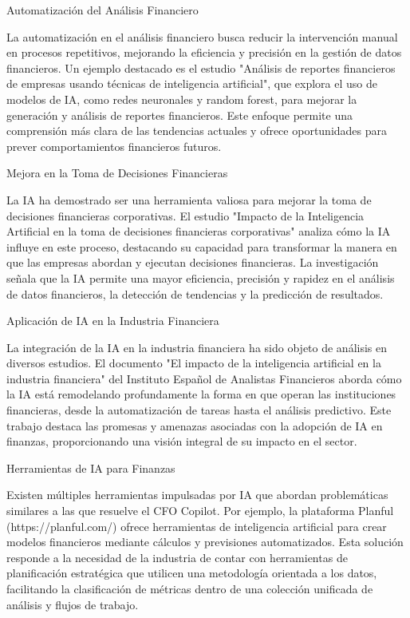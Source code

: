\documentclass[12pt,letterpaper,oneside]{report}
\renewcommand{\_}{\UnderscoreOriginal\allowbreak}
\begin{document}
Automatización del Análisis Financiero \parencite{David2024}

La automatización en el análisis financiero busca reducir la intervención manual en procesos repetitivos, mejorando la eficiencia y precisión en la gestión de datos financieros. Un ejemplo destacado es el estudio "Análisis de reportes financieros de empresas usando técnicas de inteligencia artificial", que explora el uso de modelos de IA, como redes neuronales y random forest, para mejorar la generación y análisis de reportes financieros. Este enfoque permite una comprensión más clara de las tendencias actuales y ofrece oportunidades para prever comportamientos financieros futuros.

Mejora en la Toma de Decisiones Financieras \parencite{Andrade2023}

La IA ha demostrado ser una herramienta valiosa para mejorar la toma de decisiones financieras corporativas. El estudio "Impacto de la Inteligencia Artificial en la toma de decisiones financieras corporativas" analiza cómo la IA influye en este proceso, destacando su capacidad para transformar la manera en que las empresas abordan y ejecutan decisiones financieras. La investigación señala que la IA permite una mayor eficiencia, precisión y rapidez en el análisis de datos financieros, la detección de tendencias y la predicción de resultados.

Aplicación de IA en la Industria Financiera \parencite{Contreras2024}

La integración de la IA en la industria financiera ha sido objeto de análisis en diversos estudios. El documento "El impacto de la inteligencia artificial en la industria financiera" del Instituto Español de Analistas Financieros aborda cómo la IA está remodelando profundamente la forma en que operan las instituciones financieras, desde la automatización de tareas hasta el análisis predictivo. Este trabajo destaca las promesas y amenazas asociadas con la adopción de IA en finanzas, proporcionando una visión integral de su impacto en el sector.

Herramientas de IA para Finanzas \parencite{MetamandrillCom2024}

Existen múltiples herramientas impulsadas por IA que abordan problemáticas similares a las que resuelve el CFO Copilot. Por ejemplo, la plataforma Planful (https://planful.com/) ofrece herramientas de inteligencia artificial para crear modelos financieros mediante cálculos y previsiones automatizados. Esta solución responde a la necesidad de la industria de contar con herramientas de planificación estratégica que utilicen una metodología orientada a los datos, facilitando la clasificación de métricas dentro de una colección unificada de análisis y flujos de trabajo.
\end{document}
